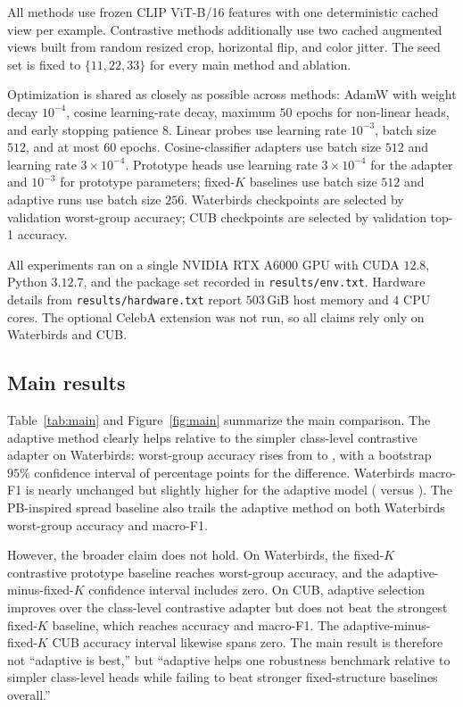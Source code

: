 \documentclass[10pt,twocolumn]{article}
\begin{document}
All methods use frozen CLIP ViT-B/16 features with one deterministic cached view per example. Contrastive methods additionally use two cached augmented views built from random resized crop, horizontal flip, and color jitter. The seed set is fixed to $\{11,22,33\}$ for every main method and ablation.

Optimization is shared as closely as possible across methods: AdamW with weight decay $10^{-4}$, cosine learning-rate decay, maximum $50$ epochs for non-linear heads, and early stopping patience $8$. Linear probes use learning rate $10^{-3}$, batch size $512$, and at most $60$ epochs. Cosine-classifier adapters use batch size $512$ and learning rate $3\times 10^{-4}$. Prototype heads use learning rate $3\times 10^{-4}$ for the adapter and $10^{-3}$ for prototype parameters; fixed-$K$ baselines use batch size $512$ and adaptive runs use batch size $256$. Waterbirds checkpoints are selected by validation worst-group accuracy; CUB checkpoints are selected by validation top-1 accuracy.

All experiments ran on a single NVIDIA RTX A6000 GPU with CUDA $12.8$, Python $3.12.7$, and the package set recorded in \texttt{results/env.txt}. Hardware details from \texttt{results/hardware.txt} report $503$\,GiB host memory and $4$ CPU cores. The optional CelebA extension was not run, so all claims rely only on Waterbirds and CUB.

\subsection{Main results}
Table~\ref{tab:main} and Figure~\ref{fig:main} summarize the main comparison. The adaptive method clearly helps relative to the simpler class-level contrastive adapter on Waterbirds: worst-group accuracy rises from \WbContrastiveWorst{} to \WbAdaptiveWorst{}, with a bootstrap $95\%$ confidence interval of \WbAdaptiveVsContrastiveCI{} percentage points for the difference. Waterbirds macro-F1 is nearly unchanged but slightly higher for the adaptive model (\WbAdaptiveMacroFOne{} versus \WbContrastiveMacroFOne{}). The PB-inspired spread baseline also trails the adaptive method on both Waterbirds worst-group accuracy and macro-F1.

However, the broader claim does not hold. On Waterbirds, the fixed-$K$ contrastive prototype baseline reaches \WbFixedKWorst{} worst-group accuracy, and the adaptive-minus-fixed-$K$ confidence interval \WbAdaptiveVsFixedKCI{} includes zero. On CUB, adaptive selection improves over the class-level contrastive adapter but does not beat the strongest fixed-$K$ baseline, which reaches \CubFixedKAcc{} accuracy and \CubFixedKMacroFOne{} macro-F1. The adaptive-minus-fixed-$K$ CUB accuracy interval \CubAdaptiveVsFixedKCI{} likewise spans zero. The main result is therefore not ``adaptive is best,'' but ``adaptive helps one robustness benchmark relative to simpler class-level heads while failing to beat stronger fixed-structure baselines overall.''
\end{document}
